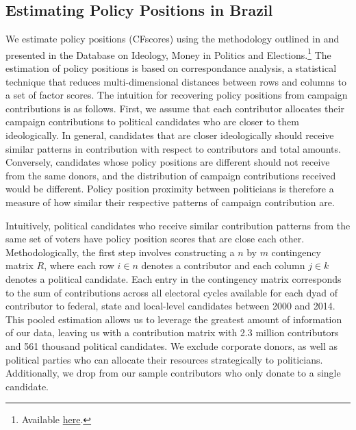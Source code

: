 \documentclass[12pt,english]{article}
\numberwithin{equation}{section}
\theoremstyle{plain}
\theoremstyle{remark}
\theoremstyle{plain}
\begin{document}
\subsection{Estimating Policy Positions in Brazil}
\label{cfscore_appendix}

We estimate policy positions (CFscores) using the methodology outlined in  and presented in the Database on Ideology, Money in Politics and Elections.\footnote{Available \href{https://web.stanford.edu/~bonica/data.html}{here}.} The estimation of policy positions is based on correspondance analysis, a statistical technique that reduces multi-dimensional distances between rows and columns to a set of factor scores. The intuition for recovering policy positions from campaign contributions is as follows. First, we assume that each contributor allocates their campaign contributions to political candidates who are closer to them ideologically. In general, candidates that are closer ideologically should receive similar patterns in contribution with respect to contributors and total amounts. Conversely, candidates whose policy positions are different should not receive from the same donors, and the distribution of campaign contributions received would be different. Policy position proximity between politicians is therefore a measure of how similar their respective patterns of campaign contribution are.

Intuitively, political candidates who receive similar contribution patterns from the same set of voters have policy position scores that are close each other. Methodologically, the first step involves constructing a $n$ by $m$ contingency matrix $R$, where each row $i \in n$ denotes a contributor and each column $j \in k$ denotes a political candidate. Each entry in the contingency matrix corresponds to the sum of contributions across all electoral cycles available for each dyad of contributor to federal, state and local-level candidates between 2000 and 2014. This pooled estimation allows us to leverage the greatest amount of information  of our data, leaving us with a contribution matrix with 2.3 million contributors and 561 thousand political candidates. We exclude corporate donors, as well as political parties who can allocate their resources strategically to politicians. Additionally, we drop from our sample contributors who only donate to a single candidate.
\end{document}

